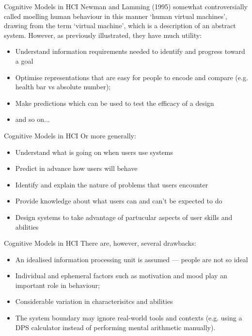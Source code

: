 \begin{frame}{Cognitive Models in HCI}
	Newman and Lamming (1995) somewhat controversially called moelling human behaviour in this manner `human virtual machines', drawing from the 
	term `virtual machine', which is a description of an abstract system. However, as previously illustrated, they have much utility:
	
	\vspace{2ex}

	\begin{itemize}
		\item Understand information requirements needed to identify and progress toward a goal
		\item Optimise representations that are easy for people to encode and compare (e.g. health bar vs absolute number);
		\item Make predictions which can be used to test the efficacy of a design
		\item and so on...
	\end{itemize}
\end{frame}

\begin{frame}{Cognitive Models in HCI}
	Or more generally:
	
	\vspace{2ex}

	\begin{itemize}
		\item Understand what is going on when users use systems
		\item Predict in advance how users will behave
		\item Identify and explain the nature of problems that users encounter
		\item Provide knowledge about what users can and can't be expected to do
		\item Design systems to take advantage of partucular aspects of user skills and abilities
	\end{itemize}
\end{frame}

\begin{frame}{Cognitive Models in HCI}
	There are, however, several drawbacks:
	
	\vspace{2ex}

	\begin{itemize}
		\item An idealised information processing unit is assumed --- people are not so ideal
		\item Individual and ephemeral factors such as motivation and mood play an important role in behaviour;
		\item Considerable variation in characterisitcs and abilities
		\item The system boundary may ignore real-world tools and contexts (e.g. using a DPS calculator instead of performing mental arithmetic manually).
	\end{itemize}
\end{frame}

